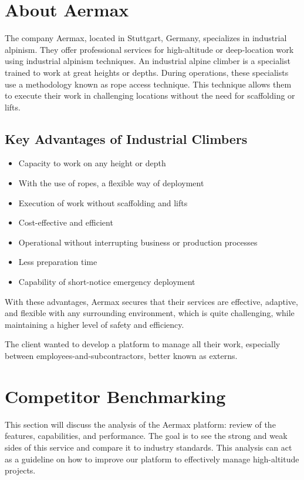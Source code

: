 \section{About Aermax}

The company Aermax, located in Stuttgart, Germany, specializes in industrial alpinism. They offer professional services for high-altitude or deep-location work using industrial alpinism techniques. An industrial alpine climber is a specialist trained to work at great heights or depths. During operations, these specialists use a methodology known as rope access technique. This technique allows them to execute their work in challenging locations without the need for scaffolding or lifts.
\subsection*{Key Advantages of Industrial Climbers}
\begin{itemize}
  \item Capacity to work on any height or depth
  \item With the use of ropes, a flexible way of deployment
  \item Execution of work without scaffolding and lifts
  \item Cost-effective and efficient
  \item Operational without interrupting business or production processes
  \item Less preparation time
  \item Capability of short-notice emergency deployment
\end{itemize}

With these advantages, Aermax secures that their services are effective, adaptive, and flexible with any surrounding environment, which is quite challenging, while maintaining a higher level of safety and efficiency.

The client wanted to develop a platform to manage all their work, especially between employees-and-subcontractors, better known as externs.

\section{Competitor Benchmarking}
This section will discuss the analysis of the Aermax platform: review of the features, capabilities, and performance. The goal is to see the strong and weak sides of this service and compare it to industry standards. This analysis can act as a guideline on how to improve our platform to effectively manage high-altitude projects.

